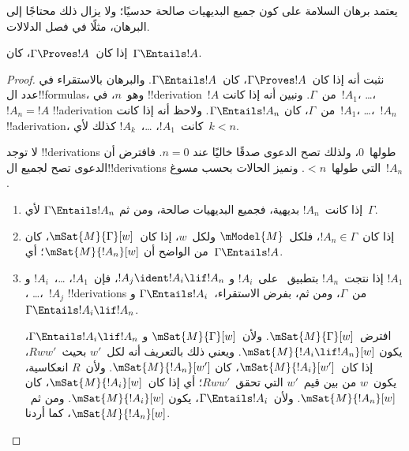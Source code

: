 \documentclass[../../../include/open-logic-section]{subfiles}
\begin{document}


\begin{editorial}
  يعتمد برهان السلامة على كون جميع البديهيات صالحة حدسيًا؛ ولا يزال ذلك
  محتاجًا إلى البرهان، مثلًا في فصل الدلالات.
\end{editorial}

\begin{thm}[السلامة]
  إذا كان~$\Gamma \Proves !A$، كان~$\Gamma \Entails !A$.
\end{thm}

\begin{proof}
  نثبت أنه إذا كان~$\Gamma \Proves !A$، كان~$\Gamma \Entails !A$.
  والبرهان بالاستقراء في عدد ال!!{formula}s، وهو~$n$، في
  !!{derivation}~$!A$ من~$\Gamma$. ونبين أنه إذا كانت~$!A_1$،
  \dots،~$!A_n=!A$ !!a{derivation} من~$\Gamma$، كان
  $\Gamma \Entails !A_n$. ولاحظ أنه إذا كانت~$!A_1$، \dots،~$!A_n$
  !!a{derivation}، كانت~$!A_1$، \dots،~$!A_k$ كذلك لأي~$k<n$.

  لا توجد !!{derivation}s طولها~$0$، ولذلك تصح الدعوى صدقًا خاليًا عند
  $n=0$. فافترض أن الدعوى تصح لجميع ال!!{derivation}s التي طولها~$<n$.
  ونميز الحالات بحسب مسوغ~$!A_n$.

  \begin{enumerate}
  \item إذا كانت~$!A_n$ بديهية، فجميع البديهيات صالحة، ومن ثم
    $\Gamma \Entails !A_n$ لأي~$\Gamma$.
  \item إذا كان~$!A_n \in \Gamma$، فلكل~$\mModel{M}$ ولكل~$w$، إذا
    كان~$\mSat{M}{\Gamma}[w]$، كان من الواضح أن
    $\mSat{M}{!A_n}[w]$؛ أي~$\Gamma \Entails !A$.
  \item إذا نتجت~$!A_n$ بتطبيق~\MP{} على~$!A_i$ و
    $!A_j \ident !A_i \lif !A_n$، فإن~$!A_1$، \dots،~$!A_i$ و
    $!A_1$، \dots،~$!A_j$ !!{derivation}s من~$\Gamma$، ومن ثم، بفرض
    الاستقراء،~$\Gamma \Entails !A_i$ و
    $\Gamma \Entails !A_i \lif !A_n$.

    افترض~$\mSat{M}{\Gamma}[w]$. ولأن~$\mSat{M}{\Gamma}[w]$ و
    $\Gamma \Entails !A_i \lif !A_n$، يكون
    $\mSat{M}{!A_i \lif !A_n}[w]$. ويعني ذلك بالتعريف أنه لكل~$w'$
    بحيث~$Rww'$، إذا كان~$\mSat{M}{!A_i}[w']$، كان
    $\mSat{M}{!A_n}[w']$. ولأن~$R$ انعكاسية، يكون~$w$ من بين قيم~$w'$
    التي تحقق~$Rww'$؛ أي إذا كان~$\mSat{M}{!A_i}[w]$، كان
    $\mSat{M}{!A_n}[w]$. ولأن~$\Gamma \Entails !A_i$، يكون
    $\mSat{M}{!A_i}[w]$. ومن ثم~$\mSat{M}{!A_n}[w]$، كما أردنا.
  \end{enumerate}
\end{proof}
\end{document}
